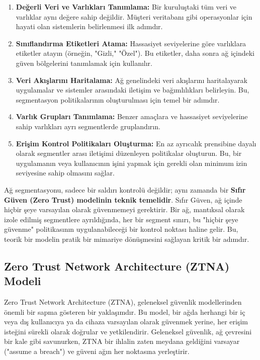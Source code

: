 \begin{enumerate}
\item \textbf{Değerli Veri ve Varlıkları Tanımlama:} Bir kuruluştaki tüm veri ve varlıklar aynı değere sahip değildir. Müşteri veritabanı gibi operasyonlar için hayati olan sistemlerin belirlenmesi ilk adımdır.
\item \textbf{Sınıflandırma Etiketleri Atama:} Hassasiyet seviyelerine göre varlıklara etiketler atayın (örneğin, "Gizli," "Özel"). Bu etiketler, daha sonra ağ içindeki güven bölgelerini tanımlamak için kullanılır.
\item \textbf{Veri Akışlarını Haritalama:} Ağ genelindeki veri akışlarını haritalayarak uygulamalar ve sistemler arasındaki iletişim ve bağımlılıkları belirleyin. Bu, segmentasyon politikalarının oluşturulması için temel bir adımdır.
\item \textbf{Varlık Grupları Tanımlama:} Benzer amaçlara ve hassasiyet seviyelerine sahip varlıkları ayrı segmentlerde gruplandırın.
\item \textbf{Erişim Kontrol Politikaları Oluşturma:} En az ayrıcalık prensibine dayalı olarak segmentler arası iletişimi düzenleyen politikalar oluşturun. Bu, bir uygulamanın veya kullanıcının işini yapmak için gerekli olan minimum izin seviyesine sahip olmasını sağlar.
\end{enumerate}

Ağ segmentasyonu, sadece bir saldırı kontrolü değildir; aynı zamanda bir \textbf{Sıfır Güven (Zero Trust) modelinin teknik temelidir}. Sıfır Güven, ağ içinde hiçbir şeye varsayılan olarak güvenmemeyi gerektirir. Bir ağ, mantıksal olarak izole edilmiş segmentlere ayrıldığında, her bir segment sınırı, bu "hiçbir şeye güvenme" politikasının uygulanabileceği bir kontrol noktası haline gelir. Bu, teorik bir modelin pratik bir mimariye dönüşmesini sağlayan kritik bir adımdır.

\subsection{Zero Trust Network Architecture (ZTNA) Modeli}

Zero Trust Network Architecture (ZTNA), geleneksel güvenlik modellerinden önemli bir sapma gösteren bir yaklaşımdır. Bu model, bir ağda herhangi bir iç veya dış kullanıcıya ya da cihaza varsayılan olarak güvenmek yerine, her erişim isteğini sürekli olarak doğrular ve yetkilendirir. Geleneksel güvenlik, ağ çevresini bir kale gibi savunurken, ZTNA bir ihlalin zaten meydana geldiğini varsayar ("assume a breach") ve güveni ağın her noktasına yerleştirir.

